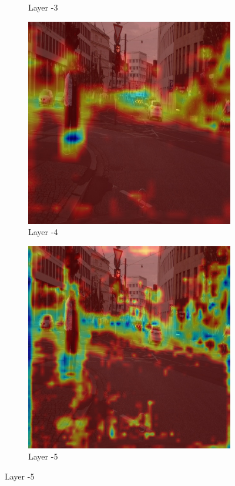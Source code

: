 \begin{figure}[h]
\begin{subfigure}[b]{0.24\textwidth}
        \caption{Layer -3}
        \label{fig:-3}
    \end{subfigure}
    \hfill
    \begin{subfigure}[b]{0.24\textwidth}
        \centering
        \includegraphics[width=\textwidth]{figures/bonn_000035_000019_leftImg8bit.pnglayer-4/bonn_000035_000019_leftImg8bit.png_object(0)_heatmap}
        \caption{Layer -4}
        \label{fig:-4}
    \end{subfigure}
    \hfill
    \begin{subfigure}[b]{0.24\textwidth}
        \centering
        \includegraphics[width=\textwidth]{figures/bonn_000035_000019_leftImg8bit.pnglayer-5/bonn_000035_000019_leftImg8bit.png_object(0)_heatmap}
        \caption{Layer -5}
        \label{fig:-5}
    \end{subfigure}
    \hfill


\end{figure}
